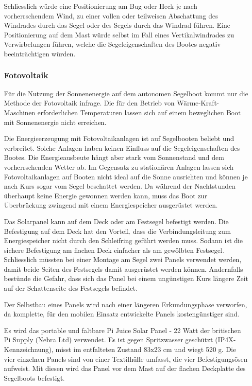 Schliesslich würde eine Positionierung am Bug oder Heck je nach vorherrschendem Wind, zu einer vollen oder teilweisen Abschattung des Windrades durch das Segel oder des Segels durch das Windrad führen. Eine Positionierung auf dem Mast würde selbst im Fall eines Vertikalwindrades zu Verwirbelungen führen, welche die Segeleigenschaften des Bootes negativ beeinträchtigen würden.

\subsubsection{Fotovoltaik}
Für die Nutzung der Sonnenenergie auf dem autonomen Segelboot kommt nur die Methode der Fotovoltaik infrage. Die für den Betrieb von Wärme-Kraft-Maschinen erforderlichen Temperaturen lassen sich auf einem beweglichen Boot mit Sonnenenergie nicht erreichen.

Die Energieerzeugung mit Fotovoltaikanlagen ist auf Segelbooten beliebt und verbreitet. Solche Anlagen haben keinen Einfluss auf die Segeleigenschaften des Bootes. Die Energieausbeute hängt aber stark vom Sonnenstand und dem vorherrschenden Wetter ab. Im Gegensatz zu stationären Anlagen lassen sich Fotovoltaikanlagen auf Booten nicht ideal auf die Sonne ausrichten und können je nach Kurs sogar vom Segel beschattet werden. Da während der Nachtstunden überhaupt keine Energie gewonnen werden kann, muss das Boot zur Überbrückung zwingend mit einem Energiespeicher ausgerüstet werden.

Das Solarpanel kann auf dem Deck oder am Festsegel befestigt werden. Die Befestigung auf dem Deck hat den Vorteil, dass die Verbindungsleitung zum Energiespeicher nicht durch den Schleifring geführt werden muss. Sodann ist die sichere Befestigung am flachen Deck einfacher als am gewölbten Festsegel. Schliesslich müssten bei einer Montage am Segel zwei Panels verwendet werden, damit beide Seiten des Festsegels damit ausgerüstet werden können. Andernfalls bestünde die Gefahr, dass sich das Panel bei einem ungünstigen Kurs längere Zeit auf der Schattenseite des Festsegels befindet.  

Der Selbstbau eines Panels wird nach einer längeren Erkundungsphase verworfen, da komplette, für den mobilen Einsatz entwickelte Panels kostengünstiger sind.   

Es wird das portable und faltbare Pi Juice Solar Panel - 22 Watt der britischen Pi Supply (Nebra Ltd) verwendet. Es ist gegen Spritzwasser geschützt (IP4X-Kennzeichnung), misst im entfalteten Zustand 83x23 cm und wiegt 520 g. Die vier einzelnen Panels sind von einer Textilhülle umfasst, die vier Befestigungsösen aufweist. Mit diesen wird das Panel vor dem Mast auf der flachen Deckplatte des Segelboots befestigt.

